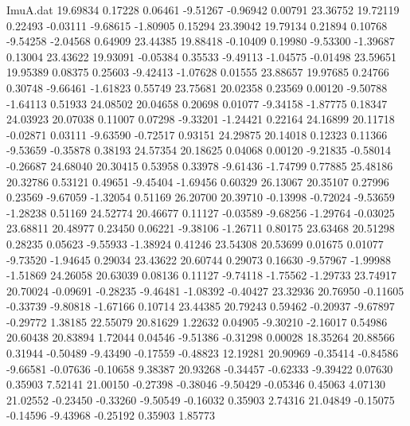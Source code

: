 \begin{filecontents}{ImuA.dat}
  19.69834    0.17228    0.06461   -9.51267   -0.96942    0.00791   23.36752
  19.72119    0.22493   -0.03111   -9.68615   -1.80905    0.15294   23.39042
  19.79134    0.21894    0.10768   -9.54258   -2.04568    0.64909   23.44385
  19.88418   -0.10409    0.19980   -9.53300   -1.39687    0.13004   23.43622
  19.93091   -0.05384    0.35533   -9.49113   -1.04575   -0.01498   23.59651
  19.95389    0.08375    0.25603   -9.42413   -1.07628    0.01555   23.88657
  19.97685    0.24766    0.30748   -9.66461   -1.61823    0.55749   23.75681
  20.02358    0.23569    0.00120   -9.50788   -1.64113    0.51933   24.08502
  20.04658    0.20698    0.01077   -9.34158   -1.87775    0.18347   24.03923
  20.07038    0.11007    0.07298   -9.33201   -1.24421    0.22164   24.16899
  20.11718   -0.02871    0.03111   -9.63590   -0.72517    0.93151   24.29875
  20.14018    0.12323    0.11366   -9.53659   -0.35878    0.38193   24.57354
  20.18625    0.04068    0.00120   -9.21835   -0.58014   -0.26687   24.68040
  20.30415    0.53958    0.33978   -9.61436   -1.74799    0.77885   25.48186
  20.32786    0.53121    0.49651   -9.45404   -1.69456    0.60329   26.13067
  20.35107    0.27996    0.23569   -9.67059   -1.32054    0.51169   26.20700
  20.39710   -0.13998   -0.72024   -9.53659   -1.28238    0.51169   24.52774
  20.46677    0.11127   -0.03589   -9.68256   -1.29764   -0.03025   23.68811
  20.48977    0.23450    0.06221   -9.38106   -1.26711    0.80175   23.63468
  20.51298    0.28235    0.05623   -9.55933   -1.38924    0.41246   23.54308
  20.53699    0.01675    0.01077   -9.73520   -1.94645    0.29034   23.43622
  20.60744    0.29073    0.16630   -9.57967   -1.99988   -1.51869   24.26058
  20.63039    0.08136    0.11127   -9.74118   -1.75562   -1.29733   23.74917
  20.70024   -0.09691   -0.28235   -9.46481   -1.08392   -0.40427   23.32936
  20.76950   -0.11605   -0.33739   -9.80818   -1.67166    0.10714   23.44385
  20.79243    0.59462   -0.20937   -9.67897   -0.29772    1.38185   22.55079
  20.81629    1.22632    0.04905   -9.30210   -2.16017    0.54986   20.60438
  20.83894    1.72044    0.04546   -9.51386   -0.31298    0.00028   18.35264
  20.88566    0.31944   -0.50489   -9.43490   -0.17559   -0.48823   12.19281
  20.90969   -0.35414   -0.84586   -9.66581   -0.07636   -0.10658    9.38387
  20.93268   -0.34457   -0.62333   -9.39422    0.07630    0.35903    7.52141
  21.00150   -0.27398   -0.38046   -9.50429   -0.05346    0.45063    4.07130
  21.02552   -0.23450   -0.33260   -9.50549   -0.16032    0.35903    2.74316
  21.04849   -0.15075   -0.14596   -9.43968   -0.25192    0.35903    1.85773

\end{filecontents}
